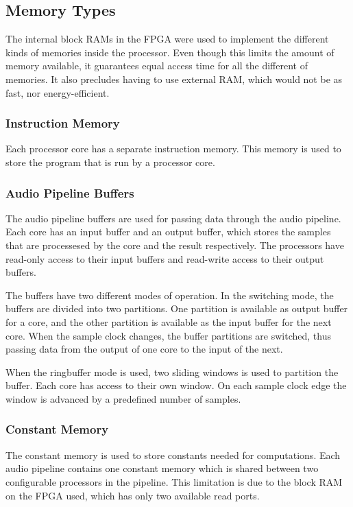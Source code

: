 
\subsection{Memory Types}\label{subsec:fpga-memory}

The internal block RAMs in the FPGA were used to implement the different kinds
of memories inside the processor. Even though this limits the amount of
memory available, it guarantees equal access time for all the different
of memories. It also precludes having to use external RAM, which would not be as
fast, nor energy-efficient.

\subsubsection{Instruction Memory}
Each processor core has a separate instruction memory. This memory is used to
store the program that is run by a processor core.

\subsubsection{Audio Pipeline Buffers}
The audio pipeline buffers are used for passing data through the audio pipeline.
Each core has an input buffer and an output buffer, which stores the samples
that are processesed by the core and the result respectively. The processors
have read-only access to their input buffers and read-write access to their
output buffers.

The buffers have two different modes of operation. In the switching mode,
the buffers are divided into two partitions. One partition is available
as output buffer for a core, and the other partition is available as the
input buffer for the next core. When the sample clock
changes, the buffer partitions are switched, thus passing data from the
output of one core to the input of the next.

When the ringbuffer mode is used, two sliding windows is used to partition
the buffer. Each core has access to their own window. On each sample clock
edge the window is advanced by a predefined number
of samples.

\subsubsection{Constant Memory}
The constant memory is used to store constants needed for computations. Each
audio pipeline contains one constant memory which is shared between two
configurable processors in the pipeline. This limitation is due to the block
RAM on the FPGA used, which has only two available read ports.


